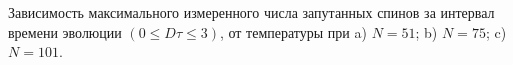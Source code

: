 Зависимость максимального измеренного числа запутанных спинов
за интервал времени эволюции $(0 \leq D\tau \leq 3)$,
от температуры при  a) $N=51$; b) $N=75$; c) $N=101$.
